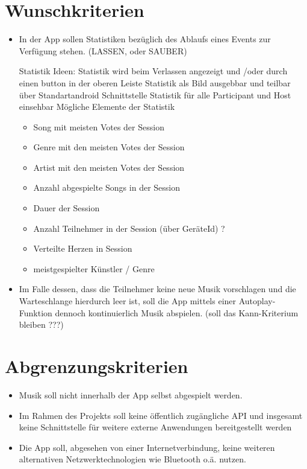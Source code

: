 \documentclass[oneside, ngerman]{sdqtechreport}
\begin{document}
\section{Wunschkriterien}
\label{sec:Zielbestimmungen:Wunschkriterien}
\begin{itemize}
    \item In der App sollen Statistiken bezüglich des Ablaufs eines Events zur Verfügung stehen. (LASSEN, oder SAUBER)
    
    Statistik Ideen:
    Statistik wird beim Verlassen angezeigt und /oder durch einen button in der oberen Leiste
    Statistik als Bild ausgebbar und teilbar über Standartandroid Schnittstelle
    Statistik für alle Participant und Host einsehbar
    Mögliche Elemente der Statistik
    \begin{itemize}
        \item Song mit meisten Votes der Session
        \item Genre mit den meisten Votes der Session
        \item Artist mit den meisten Votes der Session
        \item Anzahl abgespielte Songs in der Session
        \item Dauer der Session
        \item Anzahl Teilnehmer in der Session (über GeräteId) ?
        \item Verteilte Herzen in Session
        \item meistgespielter Künstler / Genre
    \end{itemize}
  
    \item Im Falle dessen, dass die Teilnehmer keine neue Musik vorschlagen und die Warteschlange hierdurch leer ist, soll die App mittels einer Autoplay-Funktion dennoch kontinuierlich Musik abspielen. (soll das Kann-Kriterium bleiben ???)

\end{itemize}

\section{Abgrenzungskriterien}
\label{sec:Zielbestimmungen:Abgrenzungskriterien}
\begin{itemize}
    \item Musik soll nicht innerhalb der App selbst abgespielt werden.
    \item Im Rahmen des Projekts soll keine öffentlich zugängliche API und insgesamt keine Schnittstelle für weitere externe Anwendungen bereitgestellt werden
    \item Die App soll, abgesehen von einer Internetverbindung, keine weiteren alternativen Netzwerktechnologien wie Bluetooth o.ä. nutzen.

\end{itemize}
\end{document}
